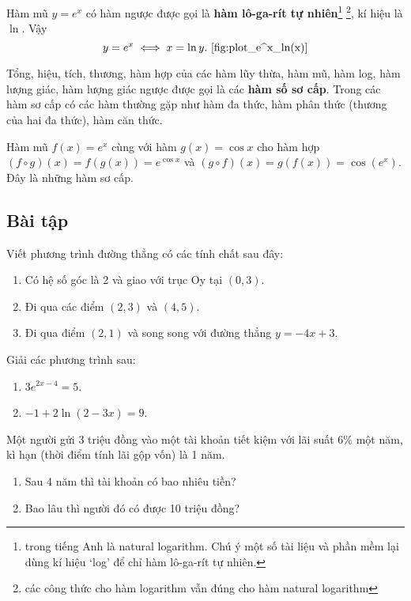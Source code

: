 Hàm mũ $y=e^x$ có hàm ngược được gọi là \textbf{hàm lô-ga-rít tự nhiên}\footnote{trong tiếng Anh là natural logarithm. Chú ý một số tài liệu và phần mềm lại dùng kí hiệu `log' để chỉ hàm lô-ga-rít tự nhiên.} \footnote{các công thức cho hàm logarithm vẫn đúng cho hàm natural logarithm}, kí hiệu là $\ln$. Vậy
\[ y = e^x \iff x = \ln y. ~\ref{fig:plot_e^x_ln(x)}\]



Tổng, hiệu, tích, thương, hàm hợp của các hàm lũy thừa, hàm mũ, hàm log, hàm lượng giác, hàm lượng giác ngược được gọi là các \textbf{hàm số sơ cấp}. Trong các hàm sơ cấp có các hàm thường gặp như hàm đa thức, hàm phân thức (thương của hai đa thức), hàm căn thức.

\begin{example}
    Hàm mũ $f(x) = e^x$ cùng với hàm $g(x) = \cos x$ cho hàm hợp $(f \circ g)(x) = f(g(x)) = e^{\cos x}$ và $(g \circ f)(x) = g(f(x)) = \cos(e^x)$. Đây là những hàm sơ cấp.
\end{example}

\subsection{Bài tập}

\begin{exercise}
Viết phương trình đường thẳng có các tính chất sau đây:
    \begin{enumerate}[label=(\alph*)]
        \item Có hệ số góc là 2 và giao với trục Oy tại $(0,3)$.
        \item Đi qua các điểm $(2,3)$ và $(4,5)$.
        \item Đi qua điểm $(2,1)$ và song song với đường thẳng $y = -4x + 3$.
    \end{enumerate}
\end{exercise}

\begin{exercise}
Giải các phương trình sau:
    \begin{enumerate}[label=(\alph*)]
        \item $3e^{2x-4} = 5$.
        \item $-1 + 2\ln(2 - 3x) = 9$.
    \end{enumerate}
\end{exercise}

\begin{exercise}
Một người gửi 3 triệu đồng vào một tài khoản tiết kiệm với lãi suất 6\% một năm, kì hạn (thời điểm tính lãi gộp vốn) là 1 năm.
    \begin{enumerate}[label=(\alph*)]
        \item Sau 4 năm thì tài khoản có bao nhiêu tiền?
        \item Bao lâu thì người đó có được 10 triệu đồng?
    \end{enumerate}
\end{exercise}

